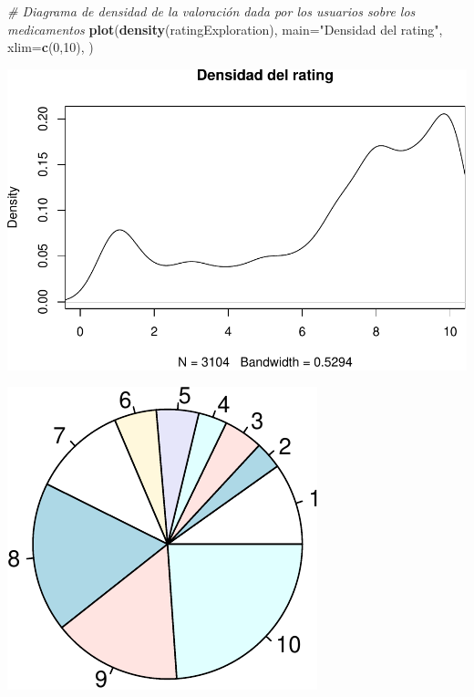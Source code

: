 \documentclass[spanish,]{article}
\newenvironment{Shaded}{\begin{snugshade}}{\end{snugshade}}
\newcommand{\KeywordTok}[1]{\textcolor[rgb]{0.13,0.29,0.53}{\textbf{#1}}}
\newcommand{\DataTypeTok}[1]{\textcolor[rgb]{0.13,0.29,0.53}{#1}}
\newcommand{\DecValTok}[1]{\textcolor[rgb]{0.00,0.00,0.81}{#1}}
\newcommand{\StringTok}[1]{\textcolor[rgb]{0.31,0.60,0.02}{#1}}
\newcommand{\CommentTok}[1]{\textcolor[rgb]{0.56,0.35,0.01}{\textit{#1}}}
\newcommand{\OperatorTok}[1]{\textcolor[rgb]{0.81,0.36,0.00}{\textbf{#1}}}
\newcommand{\NormalTok}[1]{#1}
\begin{document}
\begin{Shaded}
\begin{Highlighting}[]
\CommentTok{# Diagrama de densidad de la valoración dada por los usuarios sobre los medicamentos}
\KeywordTok{plot}\NormalTok{(}\KeywordTok{density}\NormalTok{(ratingExploration), }
     \DataTypeTok{main=}\StringTok{"Densidad del rating"}\NormalTok{,}
     \DataTypeTok{xlim=}\KeywordTok{c}\NormalTok{(}\DecValTok{0}\NormalTok{,}\DecValTok{10}\NormalTok{),}
\NormalTok{     )}
\end{Highlighting}
\end{Shaded}

\includegraphics{practica-original_files/figure-latex/unnamed-chunk-85-1.pdf}

\begin{Shaded}
\end{Shaded}

\includegraphics{practica-original_files/figure-latex/unnamed-chunk-86-1.pdf}
\end{document}
